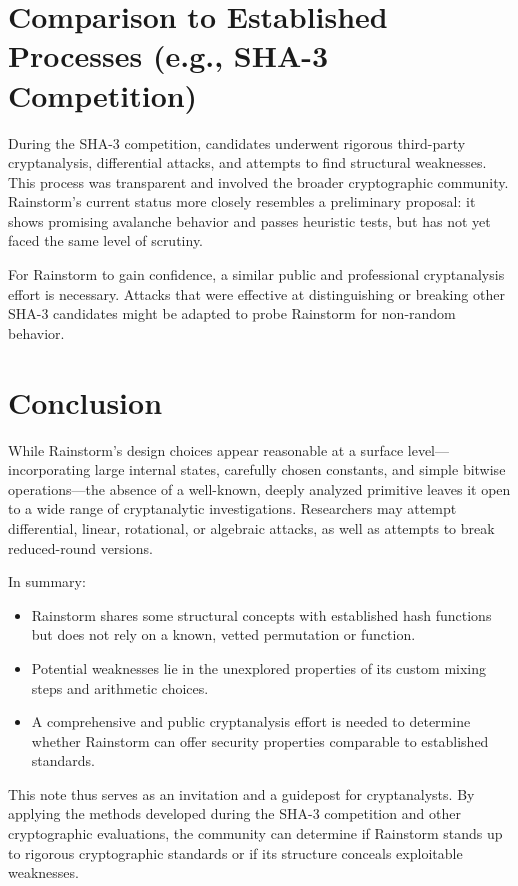 \documentclass[11pt,a4paper]{article}
\begin{document}
\section*{Comparison to Established Processes (e.g., SHA-3 Competition)}
During the SHA-3 competition, candidates underwent rigorous third-party cryptanalysis, differential attacks, and attempts to find structural weaknesses. This process was transparent and involved the broader cryptographic community. Rainstorm’s current status more closely resembles a preliminary proposal: it shows promising avalanche behavior and passes heuristic tests, but has not yet faced the same level of scrutiny.

For Rainstorm to gain confidence, a similar public and professional cryptanalysis effort is necessary. Attacks that were effective at distinguishing or breaking other SHA-3 candidates might be adapted to probe Rainstorm for non-random behavior.

\section*{Conclusion}
While Rainstorm’s design choices appear reasonable at a surface level—incorporating large internal states, carefully chosen constants, and simple bitwise operations—the absence of a well-known, deeply analyzed primitive leaves it open to a wide range of cryptanalytic investigations. Researchers may attempt differential, linear, rotational, or algebraic attacks, as well as attempts to break reduced-round versions.

In summary:
\begin{itemize}
  \item Rainstorm shares some structural concepts with established hash functions but does not rely on a known, vetted permutation or function.
  \item Potential weaknesses lie in the unexplored properties of its custom mixing steps and arithmetic choices.
  \item A comprehensive and public cryptanalysis effort is needed to determine whether Rainstorm can offer security properties comparable to established standards.
\end{itemize}

This note thus serves as an invitation and a guidepost for cryptanalysts. By applying the methods developed during the SHA-3 competition and other cryptographic evaluations, the community can determine if Rainstorm stands up to rigorous cryptographic standards or if its structure conceals exploitable weaknesses.
\end{document}
